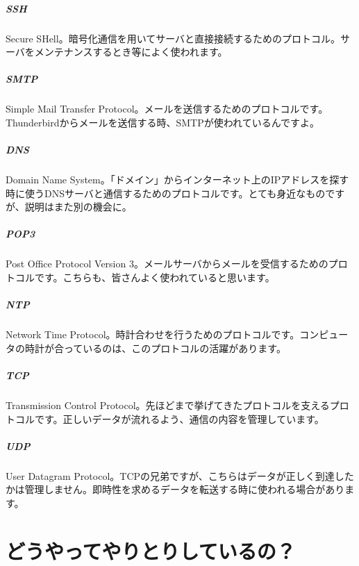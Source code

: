 \documentclass[a4j,11pt,openany]{jsbook}
\begin{document}
\paragraph{SSH\cite{RFC4250}} Secure SHell。暗号化通信を用いてサーバと直接接続するためのプロトコル。サーバをメンテナンスするとき等によく使われます。

\paragraph{SMTP\cite{RFC5321}} Simple Mail Transfer Protocol。メールを送信するためのプロトコルです。Thunderbirdからメールを送信する時、SMTPが使われているんですよ。

\paragraph{DNS\cite{RFC1034}} Domain Name System。「ドメイン」からインターネット上のIPアドレスを探す時に使うDNSサーバと通信するためのプロトコルです。とても身近なものですが、説明はまた別の機会に。

\paragraph{POP3\cite{RFC1939}} Post Office Protocol Version 3。メールサーバからメールを受信するためのプロトコルです。こちらも、皆さんよく使われていると思います。

\paragraph{NTP\cite{RFC958}} Network Time Protocol。時計合わせを行うためのプロトコルです。コンピュータの時計が合っているのは、このプロトコルの活躍があります。

\paragraph{TCP\cite{RFC793}} Transmission Control Protocol。先ほどまで挙げてきたプロトコルを支えるプロトコルです。正しいデータが流れるよう、通信の内容を管理しています。

\paragraph{UDP\cite{RFC768}} User Datagram Protocol。TCPの兄弟ですが、こちらはデータが正しく到達したかは管理しません。即時性を求めるデータを転送する時に使われる場合があります。


\chapter{どうやってやりとりしているの？}
\end{document}
